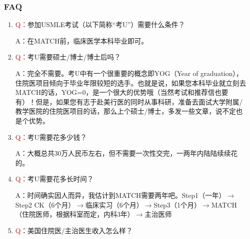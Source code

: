 \documentclass[zihao=-4,fontset=none]{Beautybook-CN}
\begin{document}
\subsubsection{FAQ}
\begin{enumerate}
    \item \textcolor{red}{Q：}参加USMLE考试（以下简称“考U”）需要什么条件？

A：在MATCH前，临床医学本科毕业即可。

\item \textcolor{red}{Q：}考U需要硕士/博士/博士后吗？

A：完全不需要。考U中有一个很重要的概念即YOG（Year of graduation），住院医项目倾向于毕业年限较短的选手。也就是说，如果您本科毕业就立刻去MATCH的话，YOG=0，是一个很大的优势哦（当然考试和推荐信也要有）！但是，如果您有志于赴美行医的同时从事科研，准备去面试大学附属/教学医院的住院医项目的话，那么上个硕士/博士，多发一些文章，说不定也是个优势。

\item \textcolor{red}{Q：}考U需要花多少钱？

A：大概总共30万人民币左右，但不需要一次性交完，一两年内陆陆续续花的。

\item \textcolor{red}{Q：}考U需要花多长时间？\label{mark-4.}

A：时间确实因人而异，我估计到MATCH需要两年吧。Step1（一年）${\rightarrow}$Step2 CK（6个月）${\rightarrow}$临床实习（6个月）${\rightarrow}$Step3（1个月）${\rightarrow}$MATCH（住院医师，根据科室而定，内科3年）${\rightarrow}$主治医师

\item \textcolor{red}{Q}：美国住院医/主治医生收入怎么样？


\end{enumerate}
\end{document}
